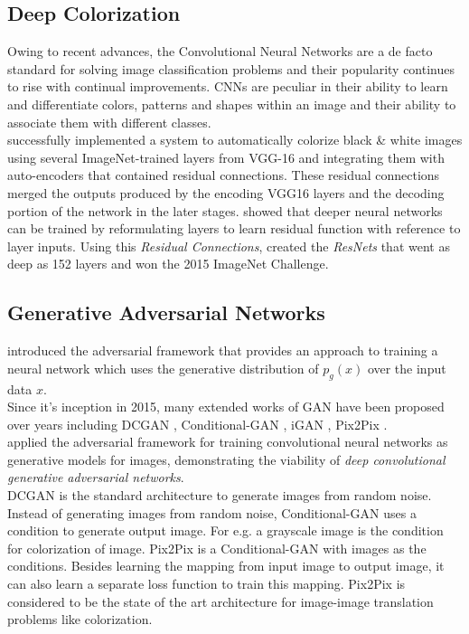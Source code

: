 \documentclass[12pt, letterpaper]{article}
\begin{document}
		\subsection{Deep Colorization}
		\hspace*{0.25 in}Owing to recent advances, the Convolutional Neural Networks are a de facto standard for solving image classification problems and their popularity continues to rise with continual improvements. CNNs are peculiar in their ability to learn and differentiate colors, patterns and shapes within an image and their ability to associate them with different classes.\\
		\hspace*{0.25 in}\cite{dahl2016automatic} successfully implemented a system to automatically colorize black \& white images using several ImageNet-trained layers from VGG-16 \cite{simonyan2015deep} and integrating them with auto-encoders that contained residual connections. These residual connections merged the outputs produced by the encoding VGG16 layers and the decoding portion of the network in the later stages. \cite{he2015deep} showed that deeper neural networks can be trained by reformulating layers to learn residual function with reference to layer inputs. Using this \textit{Residual Connections}, \cite{he2015deep} created the \textit{ResNets} that went as deep as 152 layers and won the 2015 ImageNet Challenge.
		\subsection{Generative Adversarial Networks}
		\hspace*{0.25 in}\cite{goodfellow2014generative} introduced the adversarial framework that provides an approach to training a neural network which uses the generative distribution of $p_g(x)$ over the input data $x$.\\
		\hspace*{0.25 in}Since it's inception in 2015, many extended works of GAN have been proposed over years including DCGAN \citep{radford2016unsupervised}, Conditional-GAN \citep{mirza2014conditional}, iGAN \citep{zhu2018generative}, Pix2Pix \citep{isola2018imagetoimage}.\\
		\hspace*{0.25 in}\cite{radford2016unsupervised} applied the adversarial framework for training convolutional neural networks as generative models for images, demonstrating the viability of \textit{deep convolutional generative adversarial networks}.\\
		\hspace*{0.25 in}DCGAN is the standard architecture to generate images from random noise. Instead of generating images from random noise, Conditional-GAN \citep{mirza2014conditional} uses a condition to generate output image. For e.g. a grayscale image is the condition for colorization of image. Pix2Pix \citep{isola2018imagetoimage} is a Conditional-GAN with images as the conditions. Besides learning the mapping from input image to output image, it can also learn a separate loss function to train this mapping. Pix2Pix is considered to be the state of the art architecture for image-image translation problems like colorization.
		
\renewcommand\bibname{References}


\end{document}
